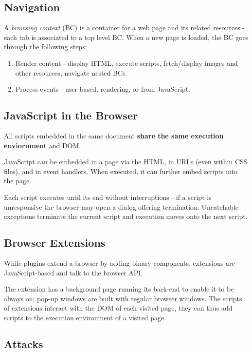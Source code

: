 \documentclass[11pt]{article}
\begin{document}
\subsection{Navigation}
A \textit{browsing context} (BC) is a container for a web page and its related resources - each tab is associated to a top level BC.
When a new page is loaded, the BC goes through the following steps:
\begin{enumerate}
  \item Render content - display HTML, execute scripts, fetch/display images and other resources, navigate nested BCs.
  \item Process events - user-based, rendering, or from JavaScript.
\end{enumerate}

\subsection{JavaScript in the Browser}
All scripts embedded in the same document \textbf{share the same execution enviornment} and DOM.

JavaScript can be embedded in a page via the HTML, in URLs (even within CSS files), and in event handlers.
When executed, it can further embed scripts into the page.

Each script executes until its end without interruptions - if a script is unresponsive the browser may open a dialog offering termination.
Uncatchable exceptions terminate the current script and execution moves onto the next script.

\subsection{Browser Extensions}
While plugins extend a browser by adding binary components, extensions are JavaScript-based and talk to the browser API.

The extension has a background page running its back-end to enable it to be always on; pop-up windows are built with regular browser windows.
The scripts of extensions interact with the DOM of each visited page, they can thus add scripts to the execution environment of a visited page.

\subsection{Attacks}
\end{document}
